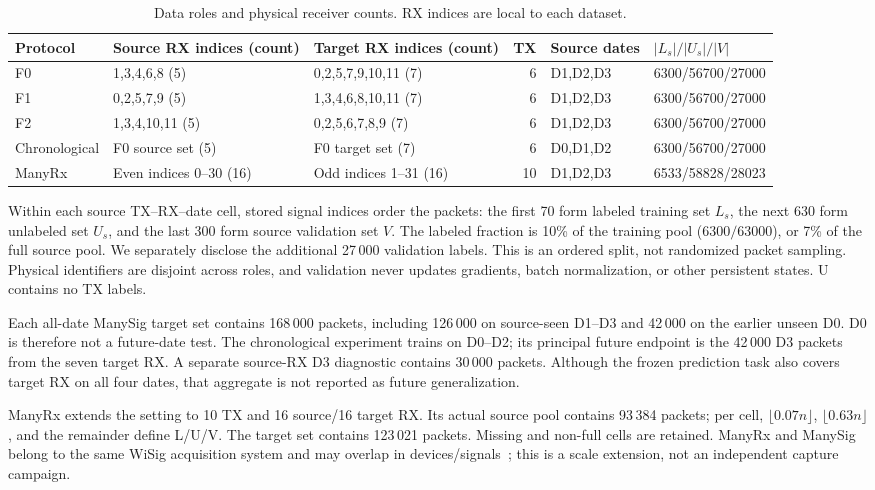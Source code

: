 \begin{table}[t]
\centering\footnotesize
\caption{Data roles and physical receiver counts. RX indices are local to each dataset.}
\label{tab:data}
\begin{tabular}{lllrll}
\toprule
Protocol & Source RX indices (count) & Target RX indices (count) & TX & Source dates & $|L_s|/|U_s|/|V|$ \\
\midrule
F0 & 1,3,4,6,8 (5) & 0,2,5,7,9,10,11 (7) & 6 & D1,D2,D3 & 6300/56700/27000 \\
F1 & 0,2,5,7,9 (5) & 1,3,4,6,8,10,11 (7) & 6 & D1,D2,D3 & 6300/56700/27000 \\
F2 & 1,3,4,10,11 (5) & 0,2,5,6,7,8,9 (7) & 6 & D1,D2,D3 & 6300/56700/27000 \\
Chronological & F0 source set (5) & F0 target set (7) & 6 & D0,D1,D2 & 6300/56700/27000 \\
ManyRx & Even indices 0--30 (16) & Odd indices 1--31 (16) & 10 & D1,D2,D3 & 6533/58828/28023 \\
\bottomrule
\end{tabular}
\end{table}

Within each source TX--RX--date cell, stored signal indices order the packets: the first 70 form labeled training set $L_s$, the next 630 form unlabeled set $U_s$, and the last 300 form source validation set $V$. The labeled fraction is 10\% of the training pool ($6300/63000$), or 7\% of the full source pool. We separately disclose the additional 27\,000 validation labels. This is an ordered split, not randomized packet sampling. Physical identifiers are disjoint across roles, and validation never updates gradients, batch normalization, or other persistent states. U contains no TX labels.

Each all-date ManySig target set contains 168\,000 packets, including 126\,000 on source-seen D1--D3 and 42\,000 on the earlier unseen D0. D0 is therefore not a future-date test. The chronological experiment trains on D0--D2; its principal future endpoint is the 42\,000 D3 packets from the seven target RX. A separate source-RX D3 diagnostic contains 30\,000 packets. Although the frozen prediction task also covers target RX on all four dates, that aggregate is not reported as future generalization.

ManyRx extends the setting to 10 TX and 16 source/16 target RX. Its actual source pool contains 93\,384 packets; per cell, $\lfloor0.07n\rfloor$, $\lfloor0.63n\rfloor$, and the remainder define L/U/V. The target set contains 123\,021 packets. Missing and non-full cells are retained. ManyRx and ManySig belong to the same WiSig acquisition system and may overlap in devices/signals~\cite{wisig}; this is a scale extension, not an independent capture campaign.


